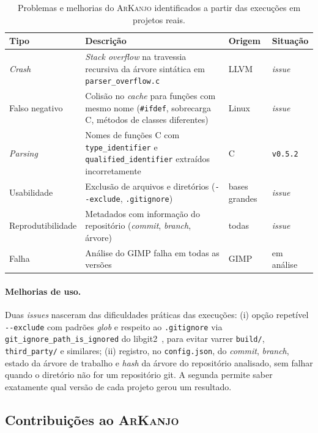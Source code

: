 \documentclass{article}
\newcommand{\cpp}{C\nolinebreak\hspace{-.05em}\raisebox{.4ex}{\relsize{-3}{\textbf{+}}}\nolinebreak\hspace{-.10em}\raisebox{.4ex}{\relsize{-3}{\textbf{+}}}}
\newcommand{\ark}{\textsc{ArKanjo}}
\begin{document}
\begin{table}[ht!]
\centering
\caption{Problemas e melhorias do \ark{} identificados a partir das execuções em projetos reais.}
\label{tab:bugs}
\begin{tabularx}{1.0\linewidth}{l >{\raggedright\arraybackslash}X l l}
\toprule
\textbf{Tipo} & \textbf{Descrição} & \textbf{Origem} & \textbf{Situação} \\
\midrule
\emph{Crash} & \emph{Stack overflow} na travessia recursiva da árvore sintática em \texttt{parser\_overflow.c} & \textsc{LLVM} & \textit{issue} \\
Falso negativo & Colisão no \textit{cache} para funções com mesmo nome (\texttt{\#ifdef}, sobrecarga \cpp, métodos de classes diferentes) & Linux & \textit{issue} \\
\emph{Parsing} & Nomes de funções \cpp{} com \texttt{type\_identifier} e \texttt{qualified\_identifier} extraídos incorretamente & \cpp & \texttt{v0.5.2} \\
Usabilidade & Exclusão de arquivos e diretórios (\texttt{-{}-exclude}, \texttt{.gitignore}) & bases grandes & \textit{issue} \\
Reprodutibilidade & Metadados com informação do repositório (\textit{commit}, \textit{branch}, árvore) & todas & \textit{issue} \\
Falha & Análise do \textsc{GIMP} falha em todas as versões & \textsc{GIMP} & em análise \\
\bottomrule
\end{tabularx}
\end{table}

\paragraph{Melhorias de uso.}
Duas \textit{issues} nasceram das dificuldades práticas das execuções: (i) opção repetível \texttt{-{}-exclude} com padrões \emph{glob} e respeito ao \texttt{.gitignore} via \texttt{git\_ignore\_path\_is\_ignored} do libgit2~\cite{libgit2}, para evitar varrer \texttt{build/}, \texttt{third\_party/} e similares; (ii) registro, no \texttt{config.json}, do \textit{commit}, \textit{branch}, estado da árvore de trabalho e \emph{hash} da árvore do repositório analisado, sem falhar quando o diretório não for um repositório git. A segunda permite saber exatamente qual versão de cada projeto gerou um resultado.

\subsection{Contribuições ao \ark}\label{sec:contrib}
\end{document}

